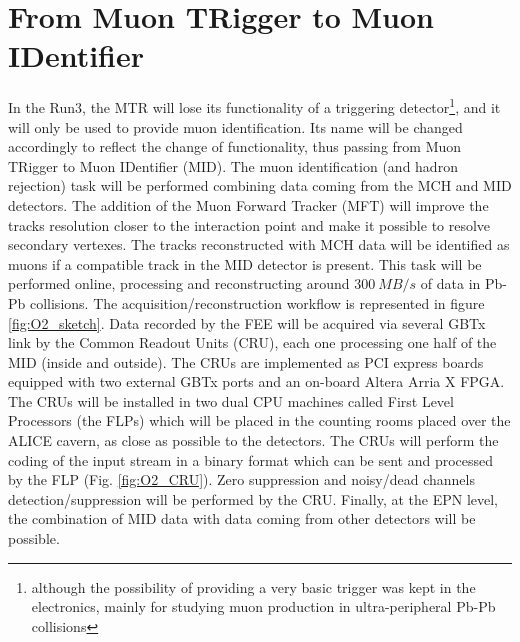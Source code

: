 \section{From Muon TRigger to Muon IDentifier}
In the Run3, the MTR will lose its functionality of a triggering detector\footnote{although the possibility of providing a very basic trigger was kept in the electronics, mainly for studying muon production in ultra-peripheral Pb-Pb collisions}, and it will only be used to provide muon identification. 
Its name will be changed accordingly to reflect the change of functionality, thus passing from Muon TRigger to Muon IDentifier (MID).
The muon identification (and hadron rejection) task will be performed combining data coming from the MCH and MID detectors.
The addition of the Muon Forward Tracker (MFT) \cite{CERN-LHCC-2015-001} will improve the tracks resolution closer to the interaction point and make it possible to resolve secondary vertexes.
The tracks reconstructed with MCH data will be identified as muons if a compatible track in the MID detector is present.
This task will be performed online, processing and reconstructing around $300\ MB/s$ \cite{Buncic:2011297} of data in Pb-Pb collisions.
The acquisition/reconstruction workflow is represented in figure \ref{fig:O2_sketch}.
Data recorded by the FEE will be acquired via several GBTx link by the Common Readout Units (CRU), each one processing one half of the MID (inside and outside).
The CRUs are implemented as PCI express boards equipped with two external GBTx ports and an on-board Altera Arria X FPGA.
The CRUs will be installed in two dual CPU machines called First Level Processors (the FLPs) which will be placed in the counting rooms placed over the ALICE cavern, as close as possible to the detectors.
The CRUs will perform the coding of the input stream in a binary format which can be sent and processed by the FLP (Fig. \ref{fig:O2_CRU}).
Zero suppression and noisy/dead channels detection/suppression will be performed by the CRU.
Finally, at the EPN level, the combination of MID data with data coming from other detectors will be possible.

